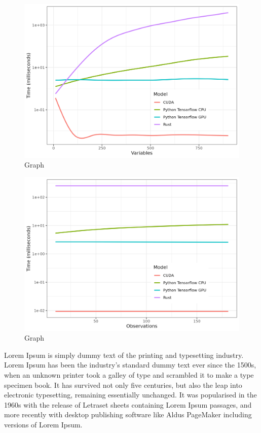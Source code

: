 \documentclass[12pt]{article}
\begin{document}
\begin{figure}[h]
    \includegraphics[width=\linewidth]{variables.png}
    \caption{Graph}
    \label{fig:graph_variables}
\end{figure}


\begin{figure}[h]
    \includegraphics[width=\linewidth]{bootstraps.png}
    \caption{Graph}
    \label{fig:graph_bootstraps}
\end{figure}

Lorem Ipsum is simply dummy text of the printing and typesetting industry. Lorem Ipsum has been the industry's standard dummy text ever since the 1500s, when an unknown printer took a galley of type and scrambled it to make a type specimen book. It has survived not only five centuries, but also the leap into electronic typesetting, remaining essentially unchanged. It was popularised in the 1960s with the release of Letraset sheets containing Lorem Ipsum passages, and more recently with desktop publishing software like Aldus PageMaker including versions of Lorem Ipsum.
\end{document}
